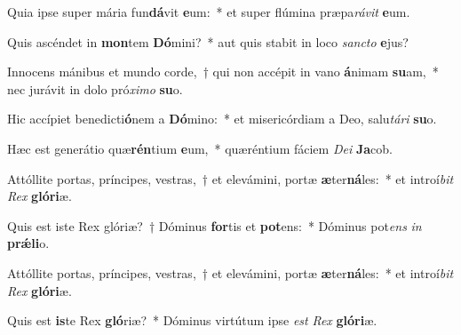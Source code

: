 \item Quia ipse super mária fun\textbf{dá}vit \textbf{e}um:~* et super flúmina præpa\textit{rá}\textit{vit} \textbf{e}um.
\item Quis ascéndet in \textbf{mon}tem \textbf{Dó}mini?~* aut quis stabit in loco \textit{sanc}\textit{to} \textbf{e}jus?
\item Innocens mánibus et mundo corde,~† qui non accépit in vano \textbf{á}nimam \textbf{su}am,~* nec jurávit in dolo pró\textit{xi}\textit{mo} \textbf{su}o.
\item Hic accípiet benedicti\textbf{ó}nem a \textbf{Dó}mino:~* et misericórdiam a Deo, salu\textit{tá}\textit{ri} \textbf{su}o.
\item Hæc est generátio quæ\textbf{rén}tium \textbf{e}um,~* quæréntium fáciem \textit{De}\textit{i} \textbf{Ja}cob.
\item Attóllite portas, príncipes, vestras,~† et elevámini, portæ \textbf{æ}ter\textbf{ná}les:~* et introí\textit{bit} \textit{Rex} \textbf{gló}\textbf{ri}æ.
\item Quis est iste Rex glóriæ?~† Dóminus \textbf{for}tis et \textbf{pot}ens:~* Dóminus pot\textit{ens} \textit{in} \textbf{prǽ}\textbf{li}o.
\item Attóllite portas, príncipes, vestras,~† et elevámini, portæ \textbf{æ}ter\textbf{ná}les:~* et introí\textit{bit} \textit{Rex} \textbf{gló}\textbf{ri}æ.
\item Quis est \textbf{is}te Rex \textbf{gló}riæ?~* Dóminus virtútum ipse \textit{est} \textit{Rex} \textbf{gló}\textbf{ri}æ.
